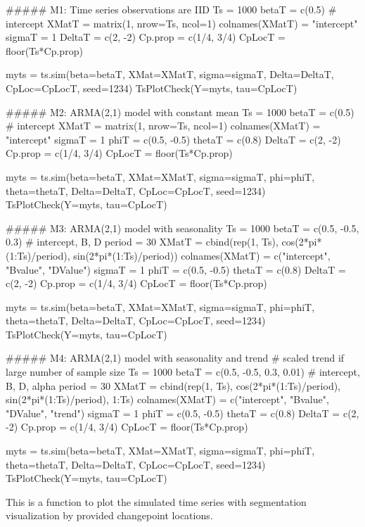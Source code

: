 \documentclass[a4paper]{book}
\begin{document}
\begin{Examples}
\begin{ExampleCode}
##### M1: Time series observations are IID
Ts = 1000
betaT = c(0.5) # intercept
XMatT = matrix(1, nrow=Ts, ncol=1)
colnames(XMatT) = "intercept"
sigmaT = 1
DeltaT = c(2, -2)
Cp.prop = c(1/4, 3/4)
CpLocT = floor(Ts*Cp.prop)

myts = ts.sim(beta=betaT, XMat=XMatT, sigma=sigmaT,
              Delta=DeltaT, CpLoc=CpLocT, seed=1234)
TsPlotCheck(Y=myts, tau=CpLocT)

##### M2: ARMA(2,1) model with constant mean
Ts = 1000
betaT = c(0.5) # intercept
XMatT = matrix(1, nrow=Ts, ncol=1)
colnames(XMatT) = "intercept"
sigmaT = 1
phiT = c(0.5, -0.5)
thetaT = c(0.8)
DeltaT = c(2, -2)
Cp.prop = c(1/4, 3/4)
CpLocT = floor(Ts*Cp.prop)

myts = ts.sim(beta=betaT, XMat=XMatT, sigma=sigmaT,
              phi=phiT, theta=thetaT, Delta=DeltaT, CpLoc=CpLocT, seed=1234)
TsPlotCheck(Y=myts, tau=CpLocT)

##### M3: ARMA(2,1) model with seasonality
Ts = 1000
betaT = c(0.5, -0.5, 0.3) # intercept, B, D
period = 30
XMatT = cbind(rep(1, Ts), cos(2*pi*(1:Ts)/period), sin(2*pi*(1:Ts)/period))
colnames(XMatT) = c("intercept", "Bvalue", "DValue")
sigmaT = 1
phiT = c(0.5, -0.5)
thetaT = c(0.8)
DeltaT = c(2, -2)
Cp.prop = c(1/4, 3/4)
CpLocT = floor(Ts*Cp.prop)

myts = ts.sim(beta=betaT, XMat=XMatT, sigma=sigmaT,
              phi=phiT, theta=thetaT, Delta=DeltaT, CpLoc=CpLocT, seed=1234)
TsPlotCheck(Y=myts, tau=CpLocT)


##### M4: ARMA(2,1) model with seasonality and trend
# scaled trend if large number of sample size
Ts = 1000
betaT = c(0.5, -0.5, 0.3, 0.01) # intercept, B, D, alpha
period = 30
XMatT = cbind(rep(1, Ts), cos(2*pi*(1:Ts)/period), sin(2*pi*(1:Ts)/period), 1:Ts)
colnames(XMatT) = c("intercept", "Bvalue", "DValue", "trend")
sigmaT = 1
phiT = c(0.5, -0.5)
thetaT = c(0.8)
DeltaT = c(2, -2)
Cp.prop = c(1/4, 3/4)
CpLocT = floor(Ts*Cp.prop)

myts = ts.sim(beta=betaT, XMat=XMatT, sigma=sigmaT,
              phi=phiT, theta=thetaT, Delta=DeltaT, CpLoc=CpLocT, seed=1234)
TsPlotCheck(Y=myts, tau=CpLocT)
\end{ExampleCode}
\end{Examples}
%
\begin{Description}
This is a function to plot the simulated time series with segmentation visualization
by provided changepoint locations.
\end{Description}
\end{document}
